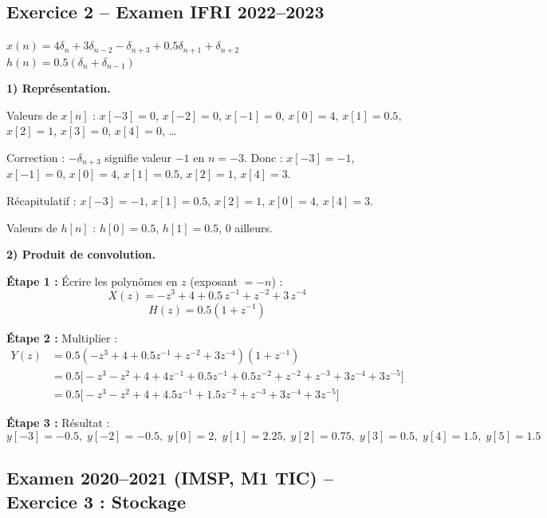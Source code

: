 \documentclass[12pt,a4paper]{article}
\newcommand{\step}[1]{\textcolor{coursbleu}{\textbf{Étape #1 :}}}
\begin{document}
\subsection{Exercice 2 -- Examen IFRI 2022--2023}

\begin{tcolorbox}[coursbox, title=Énoncé]
$x(n) = 4\delta_n + 3\delta_{n-2} - \delta_{n+3} + 0.5\delta_{n+1} + \delta_{n+2}$\\
$h(n) = 0.5(\delta_n + \delta_{n-1})$
\end{tcolorbox}

\begin{tcolorbox}[corrbox, title=Correction complète]
\textbf{1) Représentation.}

Valeurs de $x[n]$ : $x[-3] = 0$, $x[-2] = 0$, $x[-1] = 0$,
$x[0] = 4$, $x[1] = 0.5$, $x[2] = 1$, $x[3] = 0$, $x[4] = 0$, \ldots

Correction : $-\delta_{n+3}$ signifie valeur $-1$ en $n = -3$.
Donc : $x[-3] = -1$, $x[-1] = 0$, $x[0] = 4$, $x[1] = 0.5$, $x[2] = 1$, $x[4] = 3$.

Récapitulatif : $x[-3]=-1$, $x[1]=0.5$, $x[2]=1$, $x[0]=4$, $x[4]=3$.

Valeurs de $h[n]$ : $h[0] = 0.5$, $h[1] = 0.5$, 0 ailleurs.

\bigskip
\textbf{2) Produit de convolution.}

\step{1} Écrire les polynômes en $z$ (exposant $= -n$) :
\[
  X(z) = -z^3 + 4 + 0.5\,z^{-1} + z^{-2} + 3\,z^{-4}
\]
\[
  H(z) = 0.5(1 + z^{-1})
\]

\step{2} Multiplier :
\begin{align*}
  Y(z) &= 0.5(-z^3 + 4 + 0.5z^{-1} + z^{-2} + 3z^{-4})(1 + z^{-1}) \\
       &= 0.5\bigl[-z^3 - z^2 + 4 + 4z^{-1} + 0.5z^{-1} + 0.5z^{-2}
          + z^{-2} + z^{-3} + 3z^{-4} + 3z^{-5}\bigr] \\
       &= 0.5\bigl[-z^3 - z^2 + 4 + 4.5z^{-1} + 1.5z^{-2} + z^{-3} + 3z^{-4} + 3z^{-5}\bigr]
\end{align*}

\step{3} Résultat :
\[
  y[-3] = -0.5,\; y[-2] = -0.5,\; y[0] = 2,\; y[1] = 2.25,\;
  y[2] = 0.75,\; y[3] = 0.5,\; y[4] = 1.5,\; y[5] = 1.5
\]
\end{tcolorbox}

\subsection{Examen 2020--2021 (IMSP, M1 TIC) -- Exercice 3 : Stockage}
\end{document}
